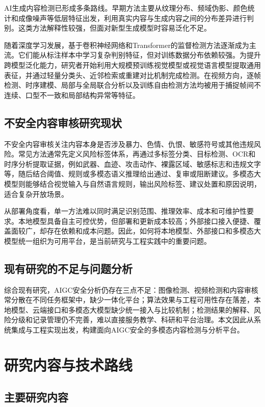 AI生成内容检测已形成多条路线。早期方法主要从纹理分布、频域伪影、颜色统计和成像噪声等低层特征出发，利用真实内容与生成内容之间的分布差异进行判别\cite{ref9,ref22}。这类方法解释性较强，但面对新型生成模型时容易泛化不足。

随着深度学习发展，基于卷积神经网络和Transformer的监督检测方法逐渐成为主流\cite{ref13,ref14}。它们能从标注样本中学习复杂判别特征，但对训练数据分布依赖较强。为提升跨模型泛化能力，研究者开始利用大规模预训练视觉模型或视觉语言模型提取通用表征，并通过轻量分类头、近邻检索或重建对比机制完成检测\cite{ref8,ref10,ref12}。在视频方向，逐帧检测、时序建模、局部与全局联合分析以及训练自由检测方法均被用于捕捉帧间不连续、口型不一致和局部结构异常等特征。

\subsection{不安全内容审核研究现状}

不安全内容审核关注内容本身是否涉及暴力、色情、仇恨、敏感符号或其他违规风险。常见方法通常先定义风险标签体系，再通过多标签分类、目标检测、OCR和时序分析提取证据，例如武器、血迹、攻击动作、裸露区域、敏感标志和违规文字等，随后结合阈值、规则或多模态语义推理给出通过、复审或阻断建议。多模态大模型则能够结合视觉输入与自然语言规则，输出风险标签、建议处置和原因说明，适合复杂开放场景。

从部署角度看，单一方法难以同时满足识别范围、推理效率、成本和可维护性要求。本地模型具备自主可控优势，但部署和更新成本较高；外部接口接入便捷、覆盖面较广，却存在依赖和成本问题。因此，如何将本地模型、外部接口和多模态大模型统一组织为可用平台，是当前研究与工程实践中的重要问题。

\subsection{现有研究的不足与问题分析}

综合现有研究，AIGC安全分析仍存在三点不足：图像检测、视频检测和内容审核常分散在不同任务框架中，缺少一体化平台；算法效果与工程可用性存在落差，本地模型、云端接口和多模态大模型缺少统一接入与比较机制；检测结果的解释、风险分级和记录管理仍不完善，难以直接服务教学、科研和平台治理。本文因此从系统集成与工程实现出发，构建面向AIGC安全的多模态内容检测与分析平台。

\section{研究内容与技术路线}

\subsection{主要研究内容}

